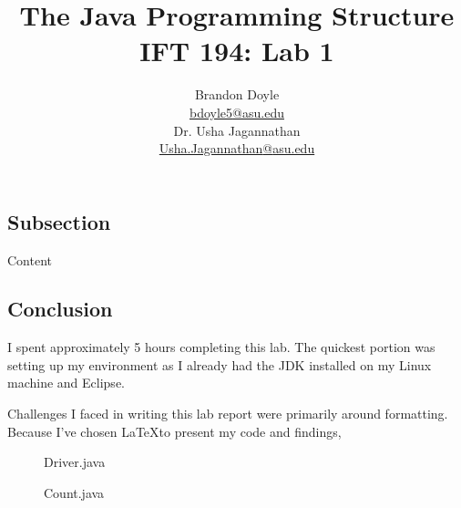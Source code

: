 \documentclass[leqno, 11pt, letter]{article}
\title{\vspace{6ex}The Java Programming Structure\\
  \Large IFT 194: Lab 1}
\author{Brandon Doyle\\
\href{mailto:bdoyle@asu.edu}{bdoyle5\mbox{}{\fontfamily{ptm}\selectfont @}\mbox{}asu.edu}\\[1em]
Dr. Usha Jagannathan\\
\href{mailto:Usha.Jagannathan@asu.edu}{Usha.Jagannathan\mbox{}{\fontfamily{ptm}\selectfont @}\mbox{}asu.edu}}
\begin{document}
\begin{titlepage}
\clearpage\maketitle
\thispagestyle{empty}
\end{titlepage}
\subsection*{Subsection}
Content
\subsection*{Conclusion}
I spent approximately 5 hours completing this lab. The quickest portion was
setting up my environment as I already had the JDK installed on my Linux 
machine and Eclipse.

Challenges I faced in writing this lab report were primarily around formatting.
Because I've chosen \LaTeX to present my code and findings, 
\newpage
\begin{figure}[t!]
  \centering
  
  \caption{Driver.java}
  \label{fig:one}
\end{figure}

\begin{figure}
  \centering
  
  \caption{Count.java}
  \label{fig:one}
\end{figure}
\end{document}
